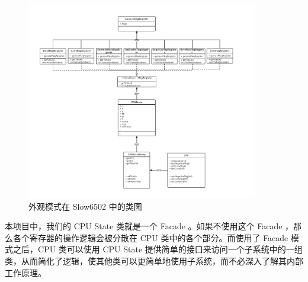 \begin{figure}[H]
    \centering
    \includegraphics[width=0.9\textwidth]{figures/Facade.pdf}
    \caption{外观模式在 Slow6502 中的类图}
\end{figure}

本项目中，我们的 CPU State 类就是一个 Facade 。如果不使用这个 Facade ，那么各个寄存器的操作逻辑会被分散在 CPU 类中的各个部分。而使用了 Facade 模式之后，CPU 类可以使用 CPU State 提供简单的接口来访问一个子系统中的一组类，从而简化了逻辑，使其他类可以更简单地使用子系统，而不必深入了解其内部工作原理。